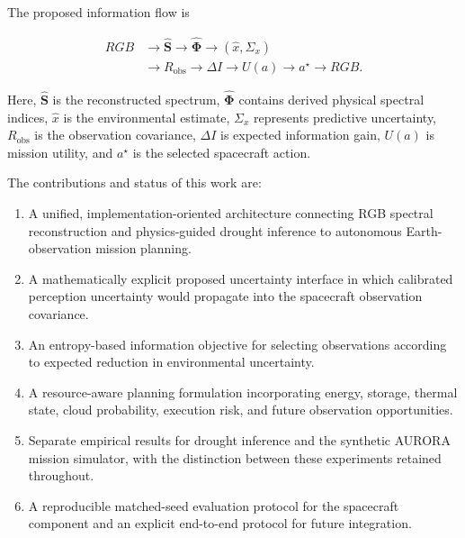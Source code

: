 \documentclass[11pt,a4paper]{article}
\begin{document}
The proposed information flow is

\begin{equation}
\boxed{
\begin{aligned}
RGB
&\rightarrow \hat{\mathbf S}
\rightarrow \hat{\boldsymbol{\Phi}}
\rightarrow (\hat{x},\Sigma_x)\\
&\rightarrow R_{\mathrm{obs}}
\rightarrow \Delta I
\rightarrow U(a)
\rightarrow a^\star
\rightarrow RGB .
\end{aligned}
}
\end{equation}

Here,
$\hat{\mathbf S}$ is the reconstructed spectrum,
$\hat{\boldsymbol{\Phi}}$ contains derived physical spectral indices,
$\hat{x}$ is the environmental estimate,
$\Sigma_x$ represents predictive uncertainty,
$R_{\mathrm{obs}}$ is the observation covariance,
$\Delta I$ is expected information gain,
$U(a)$ is mission utility, and $a^\star$ is the selected spacecraft
action.

The contributions and status of this work are:

\begin{enumerate}[leftmargin=*]

\item A unified, implementation-oriented architecture connecting RGB
spectral reconstruction and physics-guided drought inference to
autonomous Earth-observation mission planning.

\item A mathematically explicit proposed uncertainty interface in
which calibrated perception uncertainty would propagate into the
spacecraft observation covariance.

\item An entropy-based information objective for selecting
observations according to expected reduction in environmental
uncertainty.

\item A resource-aware planning formulation incorporating energy,
storage, thermal state, cloud probability, execution risk, and future
observation opportunities.

\item Separate empirical results for drought inference and the
synthetic AURORA mission simulator, with the distinction between these
experiments retained throughout.

\item A reproducible matched-seed evaluation protocol for the
spacecraft component and an explicit end-to-end protocol for future
integration.

\end{enumerate}
\end{document}
